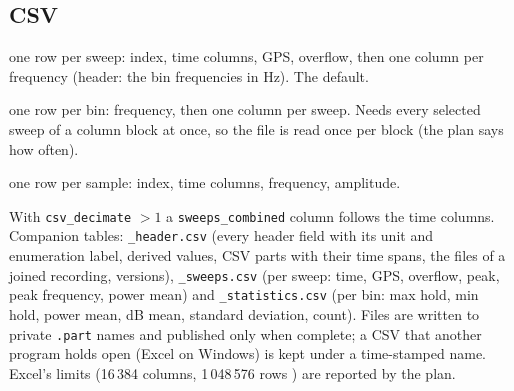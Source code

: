 \documentclass[11pt,a4paper]{article}
\newcommand{\code}[1]{\texttt{#1}}
\begin{document}
\subsection{CSV}
\begin{description}[nosep,leftmargin=3.6cm,style=nextline]
\item[\code{sweeps\_as\_rows}] one row per sweep: index, time columns, GPS, overflow, then one column per
      frequency (header: the bin frequencies in Hz). The default.
\item[\code{frequencies\_as\_rows}] one row per bin: frequency, then one column per sweep. Needs every
      selected sweep of a column block at once, so the file is read once per block (the plan says how often).
\item[\code{long}] one row per sample: index, time columns, frequency, amplitude.
\end{description}
With \code{csv\_decimate} $>1$ a \code{sweeps\_combined} column follows the time columns. Companion
tables: \code{\_header.csv} (every header field with its unit and enumeration label, derived values, CSV parts
with their time spans, the files of a joined recording, versions), \code{\_sweeps.csv} (per sweep: time,
GPS, overflow, peak, peak frequency, power mean) and \code{\_statistics.csv} (per bin: max hold, min hold,
power mean, dB mean, standard deviation, count). Files are written to private \code{.part} names and
published only when complete; a CSV that another program holds open (Excel on Windows) is kept under a
time-stamped name. Excel's limits (16\,384 columns, 1\,048\,576 rows \cite{r6}) are reported by the plan.
\end{document}
